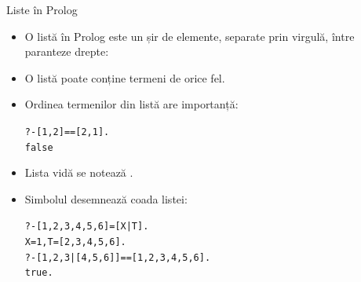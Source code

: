 \documentclass[xcolor=pdftex,romanian,colorlinks]{beamer}
\begin{document}
%	
%	 
%	
%	
%	
%
%
%
%
%

\begin{frame}{Liste în Prolog}
\begin{itemize}
\item O listă  în Prolog este un șir de elemente, separate prin virgulă,  între paranteze drepte:

\begin{center}
\end{center}
\item O listă poate conține termeni de orice fel.
\item Ordinea termenilor din listă are importanță:
\begin{alltt}
?- [1,2] == [2,1] .\\
\alert{false}
\end{alltt}
\item Lista vidă se notează \intens{[$ \, $]}.
\item Simbolul \intens{$\mid$} desemnează coada listei:
\begin{alltt}
?- [1,2,3,4,5,6] = [X|T]. \\
X = 1, T = [2, 3, 4, 5, 6].\\
\medskip
?- [1,2,3|[4,5,6]] == [1,2,3,4,5,6].\\
true.
\end{alltt}
\end{itemize}
\end{frame}
\end{document}

